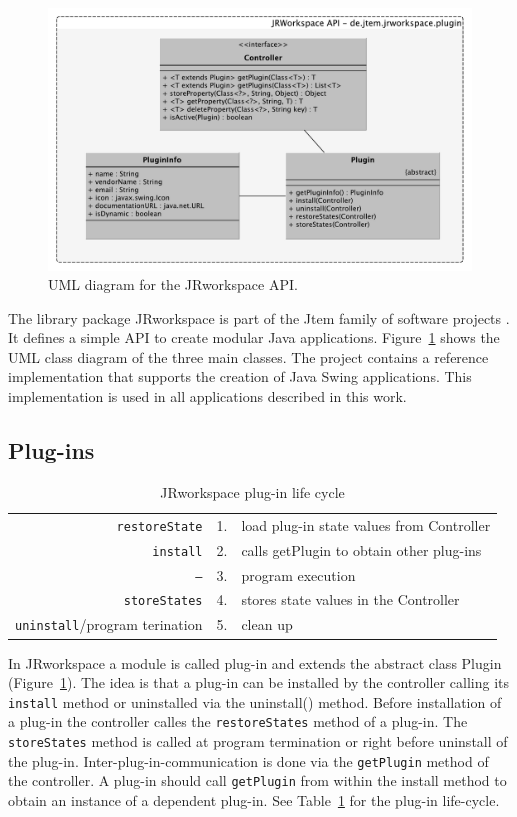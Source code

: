 \begin{figure}
	\centering
	\includegraphics[width=0.8\linewidth]{figures/jrworkspace_uml}
	\caption[{\sc JRworkspace} API]{
		UML diagram for the {\sc JRworkspace} API.
	}
	\label{fig:jrworkspace_uml}
\end{figure}

The library package {\sc JRworkspace} is part of the {\sc Jtem} family of software projects \cite{JtemWebsite}. It defines a simple API to create modular Java applications. Figure~\ref{fig:jrworkspace_uml} shows the UML class diagram of the three main classes.
The project contains a reference implementation that supports the creation of Java
Swing applications. This implementation is used in all applications described in this work.

\subsection{Plug-ins}

\begin{table}
\centering
\begin{tabular}{r|r|l}
	{\tt restoreState} & 1. & load plug-in state values from Controller\\
	{\tt install} & 2. & calls getPlugin to obtain other plug-ins\\
	{\tt --}  & 3. & program execution\\
	{\tt storeStates} & 4. & stores state values in the Controller\\
	{\tt uninstall}/program terination & 5. & clean up
\end{tabular}
\caption{{\sc JRworkspace} plug-in life cycle}
\label{tab:plugin-lifecycle}
\end{table}

In {\sc JRworkspace} a module is called plug-in and extends the abstract class Plugin
(Figure~\ref{fig:jrworkspace_uml}). The idea is that a plug-in can be installed by the controller calling its {\tt install} method or uninstalled via
the uninstall() method. Before installation of a plug-in the controller calles the
{\tt restoreStates} method of a plug-in. The {\tt storeStates} method is called at program termination or right before uninstall of the plug-in.
Inter-plug-in-communication is done via the {\tt getPlugin} method of the controller. A plug-in should call {\tt getPlugin} from within the install method to obtain an instance of a dependent plug-in. See Table~\ref{tab:plugin-lifecycle} for the plug-in life-cycle.

